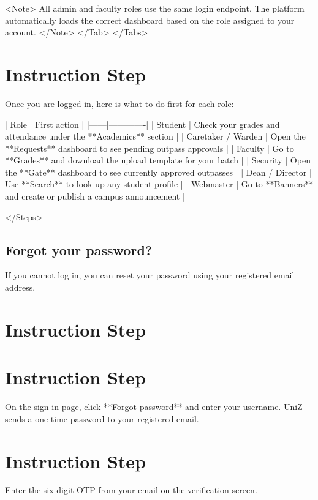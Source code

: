         <Note>
          All admin and faculty roles use the same login endpoint. The platform automatically loads the correct dashboard based on the role assigned to your account.
        </Note>
      </Tab>
    </Tabs>

  

  
\section{Instruction Step}

    Once you are logged in, here is what to do first for each role:

    | Role | First action |
    |------|-------------|
    | Student | Check your grades and attendance under the **Academics** section |
    | Caretaker / Warden | Open the **Requests** dashboard to see pending outpass approvals |
    | Faculty | Go to **Grades** and download the upload template for your batch |
    | Security | Open the **Gate** dashboard to see currently approved outpasses |
    | Dean / Director | Use **Search** to look up any student profile |
    | Webmaster | Go to **Banners** and create or publish a campus announcement |

  
</Steps>

\subsection{Forgot your password?}

If you cannot log in, you can reset your password using your registered email address.


\section{Instruction Step}

  
\section{Instruction Step}

    On the sign-in page, click **Forgot password** and enter your username. UniZ
    sends a one-time password to your registered email.
  
  
\section{Instruction Step}

    Enter the six-digit OTP from your email on the verification screen.
  

